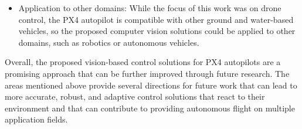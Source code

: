 \begin{itemize}
    \item Application to other domains: While the focus of this work was on drone control, the PX4 autopilot is compatible with other ground and water-based vehicles, so the proposed computer vision solutions could be applied to other domains, such as robotics or autonomous vehicles.
\end{itemize}

Overall, the proposed vision-based control solutions for PX4 autopilots are a promising approach that can be further improved through future research. The areas mentioned above provide several directions for future work that can lead to more accurate, robust, and adaptive control solutions that react to their environment and that can contribute to providing autonomous flight on multiple application fields.
